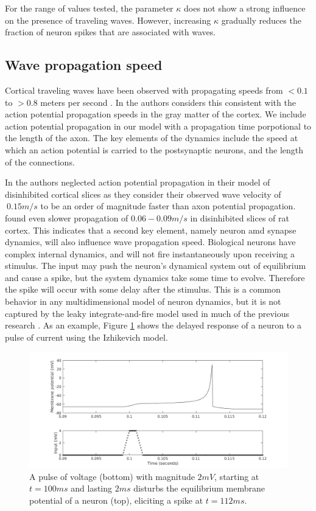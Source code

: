 \documentclass[12pt]{article}
\begin{document}
For the range of values tested, the parameter $\kappa$ does not show a strong influence on the presence of traveling waves. 
However, increasing $\kappa$ gradually reduces the fraction of neuron spikes that are associated with waves.

\subsection{Wave propagation speed} \label{sub:propagation_speed}
Cortical traveling waves have been observed with propagating speeds from $<0.1$ to $>0.8$ meters per second \parencite{Sato2012}\parencite{Golomb1997}\parencite{Chervin1988}.
In \parencite{Muller2018} the authors considers this consistent with the action potential propagation speeds in the gray matter of the cortex. 
We include action potential propagation in our model with a propagation time porpotional to the length of the axon.
The key elements of the dynamics include the speed at which an action potential is carried to the postsynaptic neurons, and the length of the connections.

In \parencite{Golomb1997} the authors neglected action potential propagation in their model of disinhibited cortical slices as they consider their observed wave velocity of $~0.15 m/s$ to be an order of magnitude faster than axon potential propagation.
\parencite{Chervin1988} found even slower propagation of $0.06-0.09 m/s$ in disinhibited slices of rat cortex.
This indicates that a second key element, namely neuron amd synapse dynamics, will also influence wave propagation speed.
Biological neurons have complex internal dynamics, and will not fire instantaneously upon receiving a stimulus.
The input may push the neuron's dynamical system out of equilibrium and cause a spike, but the system dynamics take some time to evolve.
Therefore the spike will occur with some delay after the stimulus.
This is a common behavior in any multidimensional model of neuron dynamics, but it is not captured by the leaky integrate-and-fire model used in much of the previous research \parencite{keane2015}\parencite{Senk2018}.
As an example, Figure \ref{fig:delay_neuronstep} shows the delayed response of a neuron to a pulse of current using the Izhikevich model.
\begin{figure}[!htb]
 \caption{ A pulse of voltage (bottom) with magnitude $2 mV$, starting at $t=100 ms$ and lasting $2 ms$ disturbs the equilibrium membrane potential of a neuron (top), eliciting a spike at $t=112 ms$. }
 \label{fig:delay_neuronstep}
 \centering
   \includegraphics[width=\textwidth]{fig/WaveSpeed_NeuronStepTest}
\end{figure}
\end{document}
